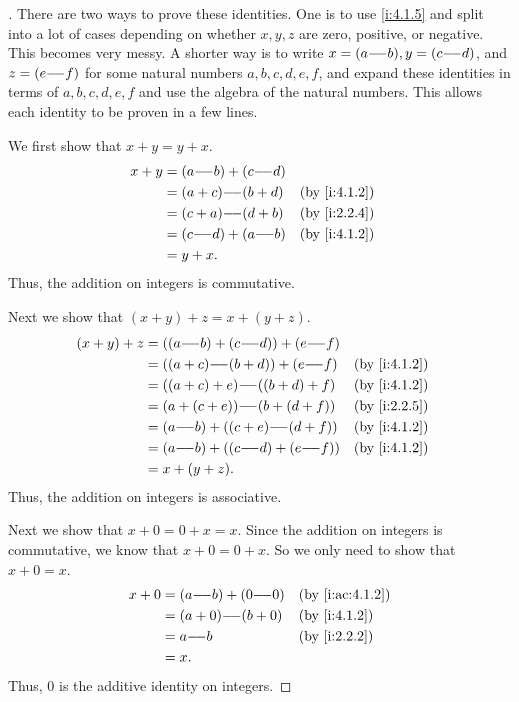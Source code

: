 \begin{proof}[]
  There are two ways to prove these identities.
  One is to use \cref{i:4.1.5} and split into a lot of cases depending on whether \(x, y, z\) are zero, positive, or negative.
  This becomes very messy.
  A shorter way is to write \(x = (a {-}\!{-} b), y = (c {-}\!{-} d)\), and \(z = (e {-}\!{-} f)\) for some natural numbers \(a, b, c, d, e, f\), and expand these identities in terms of \(a, b, c, d, e, f\) and use the algebra of the natural numbers.
  This allows each identity to be proven in a few lines.

  We first show that \(x + y = y + x\).
  \begin{align*}
    x + y & = (a \mm b) + (c \mm d) &                  \\
          & = (a + c) \mm (b + d)   &   & \by{i:4.1.2} \\
          & = (c + a) \mm (d + b)   &   & \by{i:2.2.4} \\
          & = (c \mm d) + (a \mm b) &   & \by{i:4.1.2} \\
          & = y + x.
  \end{align*}
  Thus, the addition on integers is commutative.

  Next we show that \((x + y) + z = x + (y + z)\).
  \begin{align*}
    (x + y) + z & = ((a \mm b) + (c \mm d)) + (e \mm f)                   \\
                & = ((a + c) \mm (b + d)) + (e \mm f)   &  & \by{i:4.1.2} \\
                & = ((a + c) + e) \mm ((b + d) + f)     &  & \by{i:4.1.2} \\
                & = (a + (c + e)) \mm (b + (d + f))     &  & \by{i:2.2.5} \\
                & = (a \mm b) + ((c + e) \mm (d + f))   &  & \by{i:4.1.2} \\
                & = (a \mm b) + ((c \mm d) + (e \mm f)) &  & \by{i:4.1.2} \\
                & = x + (y + z).
  \end{align*}
  Thus, the addition on integers is associative.

  Next we show that \(x + 0 = 0 + x = x\).
  Since the addition on integers is commutative, we know that \(x + 0 = 0 + x\).
  So we only need to show that \(x + 0 = x\).
  \begin{align*}
    x + 0 & = (a \mm b) + (0 \mm 0) &  & \by{i:ac:4.1.2} \\
          & = (a + 0) \mm (b + 0)   &  & \by{i:4.1.2}    \\
          & = a \mm b               &  & \by{i:2.2.2}    \\
          & = x.
  \end{align*}
  Thus, \(0\) is the additive identity on integers.


\end{proof}
